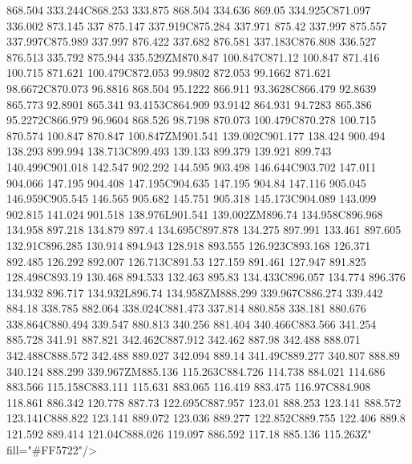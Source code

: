 868.504 333.244C868.253 333.875 868.504 334.636 869.05 334.925C871.097 336.002 873.145 337 875.147 337.919C875.284 337.971 875.42 337.997 875.557 337.997C875.989 337.997 876.422 337.682 876.581 337.183C876.808 336.527 876.513 335.792 875.944 335.529ZM870.847 100.847C871.12 100.847 871.416 100.715 871.621 100.479C872.053 99.9802 872.053 99.1662 871.621 98.6672C870.073 96.8816 868.504 95.1222 866.911 93.3628C866.479 92.8639 865.773 92.8901 865.341 93.4153C864.909 93.9142 864.931 94.7283 865.386 95.2272C866.979 96.9604 868.526 98.7198 870.073 100.479C870.278 100.715 870.574 100.847 870.847 100.847ZM901.541 139.002C901.177 138.424 900.494 138.293 899.994 138.713C899.493 139.133 899.379 139.921 899.743 140.499C901.018 142.547 902.292 144.595 903.498 146.644C903.702 147.011 904.066 147.195 904.408 147.195C904.635 147.195 904.84 147.116 905.045 146.959C905.545 146.565 905.682 145.751 905.318 145.173C904.089 143.099 902.815 141.024 901.518 138.976L901.541 139.002ZM896.74 134.958C896.968 134.958 897.218 134.879 897.4 134.695C897.878 134.275 897.991 133.461 897.605 132.91C896.285 130.914 894.943 128.918 893.555 126.923C893.168 126.371 892.485 126.292 892.007 126.713C891.53 127.159 891.461 127.947 891.825 128.498C893.19 130.468 894.533 132.463 895.83 134.433C896.057 134.774 896.376 134.932 896.717 134.932L896.74 134.958ZM888.299 339.967C886.274 339.442 884.18 338.785 882.064 338.024C881.473 337.814 880.858 338.181 880.676 338.864C880.494 339.547 880.813 340.256 881.404 340.466C883.566 341.254 885.728 341.91 887.821 342.462C887.912 342.462 887.98 342.488 888.071 342.488C888.572 342.488 889.027 342.094 889.14 341.49C889.277 340.807 888.89 340.124 888.299 339.967ZM885.136 115.263C884.726 114.738 884.021 114.686 883.566 115.158C883.111 115.631 883.065 116.419 883.475 116.97C884.908 118.861 886.342 120.778 887.73 122.695C887.957 123.01 888.253 123.141 888.572 123.141C888.822 123.141 889.072 123.036 889.277 122.852C889.755 122.406 889.8 121.592 889.414 121.04C888.026 119.097 886.592 117.18 885.136 115.263Z" fill="#FF5722"/>
